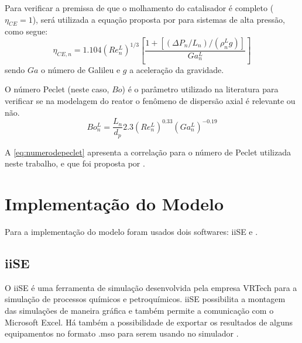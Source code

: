 
Para verificar a premissa de que o molhamento do catalisador é completo
($\eta_{CE} = 1$), será utilizada a equação proposta por
 para sistemas de alta pressão, como segue:
\begin{equation}
\eta_{CE,n} = \num{1,104}(Re_n^L)^{1/3} \left [
\dfrac{1 + [(\Delta P_n/L_{n})/(\rho_{n}^L g)]}{Ga_{n}^{L}} \right ]
\label{eq:molhamento}
\end{equation}
sendo $Ga$ o número de Galileu e $g$ a aceleração da gravidade.


O número Peclet (neste caso, $Bo$) é o parâmetro utilizado na literatura para
verificar se na modelagem do reator o fenômeno de dispersão axial é relevante ou não.
\begin{equation}
Bo_n^L = \dfrac{L_n}{d_p}
\num{2,3}(Re_n^L)^{\num{0,33}}(Ga_{n}^{L})^{\num{-0,19}}
\label{eq:numerodepeclet}
\end{equation}

A \autoref{eq:numerodepeclet} apresenta a correlação para o número de
Peclet utilizada neste trabalho, e que foi proposta por
.


\section{Implementação do Modelo} \label{sec:implementacao}

Para a implementação do modelo foram usados dois softwares: iiSE e \emso. 

\subsection{iiSE} \label{sec:iise}

O iiSE é uma ferramenta de simulação desenvolvida pela empresa VRTech para a
simulação de processos químicos e petroquímicos. iiSE possibilita a
montagem das simulações de maneira gráfica e também permite a comunicação
com o Microsoft Excel. Há também a possibilidade de exportar os resultados
de alguns equipamentos no formato .mso para serem usando no simulador \emso.

